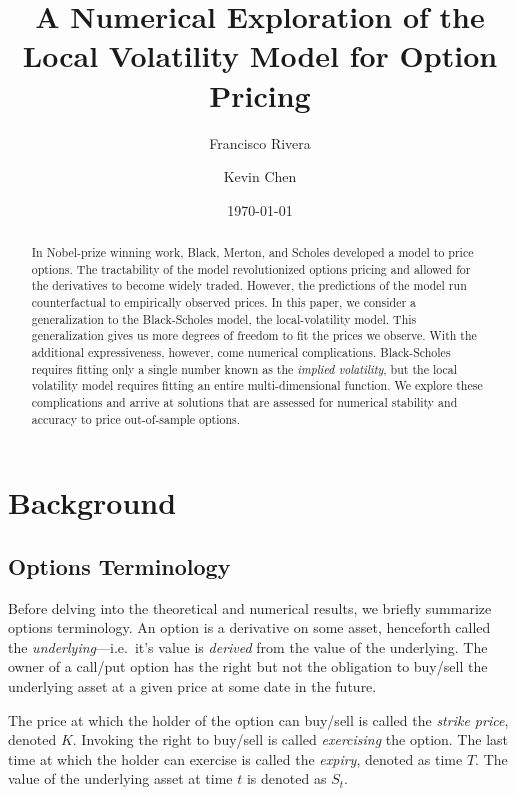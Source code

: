 \documentclass[twocolumn]{article}
\begin{document}
\onecolumn

\title{A Numerical Exploration of the Local Volatility Model for Option Pricing}
\author{Francisco Rivera \and Kevin Chen}
\date{\today}

\maketitle

\begin{abstract}
In Nobel-prize winning work, Black, Merton, and Scholes developed a model to
price options. The tractability of the model revolutionized options pricing and
allowed for the derivatives to become widely traded. However, the
predictions of the model run counterfactual to empirically observed prices. In
this paper, we consider a generalization to the Black-Scholes model, the
local-volatility model. This generalization gives us more degrees of freedom to
fit the prices we observe. With the additional expressiveness, however, come
numerical complications. Black-Scholes requires fitting only a single number
known as the \emph{implied volatility}, but the local volatility model requires
fitting an entire multi-dimensional function. We explore these complications and
arrive at solutions that are assessed for numerical stability and accuracy to
price out-of-sample options.
\end{abstract}

\tableofcontents

\twocolumn

\newpage

\section{Background}
\label{sec:background}

\subsection{Options Terminology}
\label{subsec:terminology}

Before delving into the theoretical and numerical results, we briefly summarize
options terminology. An option is a derivative on some asset, henceforth called
the \emph{underlying}---i.e.\ it's value is \emph{derived} from the value of the
underlying. The owner of a call/put option has the right but not the obligation
to buy/sell the underlying asset at a given price at some date in the future.

The price at which the holder of the option can buy/sell is called the
\emph{strike price}, denoted $K$. Invoking the right to buy/sell is called
\emph{exercising} the option. The last time at which the holder can exercise is
called the \emph{expiry}, denoted as time $T$. The value of the underlying asset
at time $t$ is denoted as $S_t$. 
\end{document}
